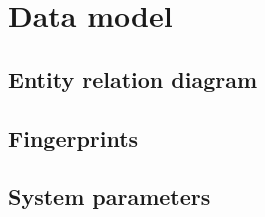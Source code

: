 \chapter{Data model}\label{cha:data-model}

\section{Entity relation diagram}\label{sec7:entity-relat-diagr}

\section{Fingerprints}\label{sec7:fingerprints}

\section{System parameters}\label{sec7:system-parameters}


